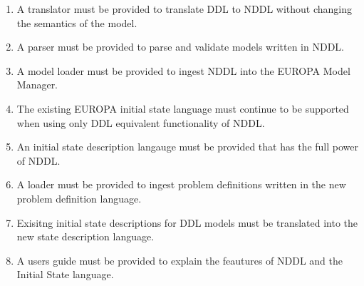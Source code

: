 \documentclass[twoside, 11pt]{article}
\begin{document}
\begin{enumerate}
\begin{enumerate}
\end{enumerate}
\item A translator must be provided to translate DDL to NDDL without changing the semantics of the model.
\item A parser must be provided to parse and validate models written in NDDL.
\item A model loader must be provided to ingest NDDL into the EUROPA Model Manager.
\item The existing EUROPA initial state language must continue to be supported when using only DDL equivalent functionality of NDDL.
\item An initial state description langauge must be provided that has the full power of NDDL.
\item A loader must be provided to ingest problem definitions written in the new problem definition language.
\item Exisitng initial state descriptions for DDL models must be translated into the new state description language.
\item A users guide must be provided to explain the feautures of NDDL and the Initial State language.
\end{enumerate}
\end{document}
